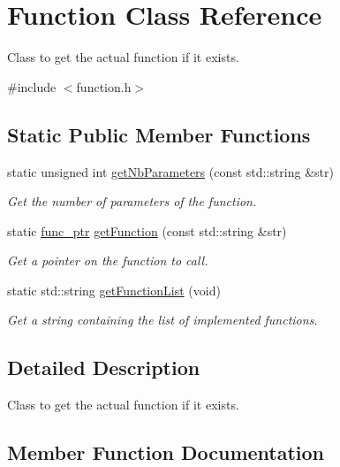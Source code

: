 \hypertarget{class_function}{}\section{Function Class Reference}
\label{class_function}


Class to get the actual function if it exists.  




{\ttfamily \#include $<$function.\+h$>$}

\subsection*{Static Public Member Functions}
\begin{DoxyCompactItemize}
\item 
static unsigned int \hyperlink{class_function_a3cc694137e1698d0537d9e4672a7123a}{get\+Nb\+Parameters} (const std\+::string \&str)
\begin{DoxyCompactList}\small\item\em Get the number of parameters of the function. \end{DoxyCompactList}\item 
static \hyperlink{function_8h_a171e664ee3179d3d1f1a7b04a747724c}{func\+\_\+ptr} \hyperlink{class_function_a58dbf2a69e3cd7a82acff3ea70e642f4}{get\+Function} (const std\+::string \&str)
\begin{DoxyCompactList}\small\item\em Get a pointer on the function to call. \end{DoxyCompactList}\item 
static std\+::string \hyperlink{class_function_a321f973005de0842251559fb2ab52160}{get\+Function\+List} (void)
\begin{DoxyCompactList}\small\item\em Get a string containing the list of implemented functions. \end{DoxyCompactList}\end{DoxyCompactItemize}


\subsection{Detailed Description}
Class to get the actual function if it exists. 

\subsection{Member Function Documentation}
\hypertarget{class_function_a58dbf2a69e3cd7a82acff3ea70e642f4}{}
